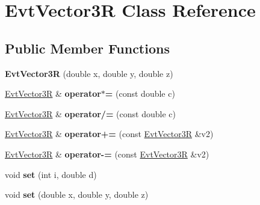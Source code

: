 \hypertarget{class_evt_vector3_r}{}\section{Evt\+Vector3\+R Class Reference}
\label{class_evt_vector3_r}
\subsection*{Public Member Functions}
\begin{DoxyCompactItemize}
\item 
\hypertarget{class_evt_vector3_r_a46b0794ac5ab465457f0336ba5026f13}{}{\bfseries Evt\+Vector3\+R} (double x, double y, double z)\label{class_evt_vector3_r_a46b0794ac5ab465457f0336ba5026f13}

\item 
\hypertarget{class_evt_vector3_r_a3ca1d34ca8bcbc61d85e50f1a4b2a30b}{}\hyperlink{class_evt_vector3_r}{Evt\+Vector3\+R} \& {\bfseries operator$\ast$=} (const double c)\label{class_evt_vector3_r_a3ca1d34ca8bcbc61d85e50f1a4b2a30b}

\item 
\hypertarget{class_evt_vector3_r_a4cb2272b210d8031a9cd18ff7e1df872}{}\hyperlink{class_evt_vector3_r}{Evt\+Vector3\+R} \& {\bfseries operator/=} (const double c)\label{class_evt_vector3_r_a4cb2272b210d8031a9cd18ff7e1df872}

\item 
\hypertarget{class_evt_vector3_r_a7667b4541605df1b2ded876404678aa9}{}\hyperlink{class_evt_vector3_r}{Evt\+Vector3\+R} \& {\bfseries operator+=} (const \hyperlink{class_evt_vector3_r}{Evt\+Vector3\+R} \&v2)\label{class_evt_vector3_r_a7667b4541605df1b2ded876404678aa9}

\item 
\hypertarget{class_evt_vector3_r_a4732b6d60e20f1c2fa08c2056e329075}{}\hyperlink{class_evt_vector3_r}{Evt\+Vector3\+R} \& {\bfseries operator-\/=} (const \hyperlink{class_evt_vector3_r}{Evt\+Vector3\+R} \&v2)\label{class_evt_vector3_r_a4732b6d60e20f1c2fa08c2056e329075}

\item 
\hypertarget{class_evt_vector3_r_a94d7a16ac6af4d6e5d352dee4bd2707d}{}void {\bfseries set} (int i, double d)\label{class_evt_vector3_r_a94d7a16ac6af4d6e5d352dee4bd2707d}

\item 
\hypertarget{class_evt_vector3_r_a91326da9dc1a85a12472661d8ad1e207}{}void {\bfseries set} (double x, double y, double z)\label{class_evt_vector3_r_a91326da9dc1a85a12472661d8ad1e207}


\end{DoxyCompactItemize}
